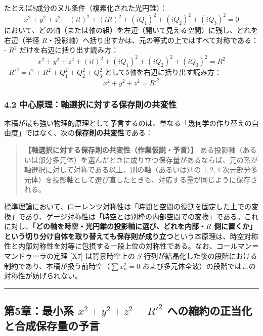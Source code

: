 \documentclass[
  a4paper,
]{ltjsarticle}
\begin{document}
たとえば8成分のヌル条件（複素化された光円錐）：
\[x^2 + y^2 + z^2 + (it)^2 + (iR)^2 + (iQ_1)^2 + (iQ_2)^2 + (iQ_3)^2 = 0\]
において、どの軸（または軸の組）を左辺（開いて見える空間）に残し、どれを右辺（半径
\(R\)・投影軸）へ括り出すかは、元の等式の上ではすべて対称である： -
\(R^2\) だけを右辺に括り出す読み方：
\[x^2 + y^2 + z^2 + (it)^2 + (iQ_1)^2 + (iQ_2)^2 + (iQ_3)^2 = R^2\] -
\(R'^2 = t^2 + R^2 + Q_1^2 + Q_2^2 + Q_3^2\)
として5軸を右辺に括り出す読み方： \[x^2 + y^2 + z^2 = R'^2\]

\subsubsection{4.2
中心原理：軸選択に対する保存則の共変性}\label{ux4e2dux5fc3ux539fux7406ux8ef8ux9078ux629eux306bux5bfeux3059ux308bux4fddux5b58ux5247ux306eux5171ux5909ux6027}

本稿が最も強い物理的原理として予言するのは、単なる「幾何学の作り替えの自由度」ではなく、次の\textbf{保存則の共変性}である：

\begin{quote}
\textbf{【軸選択に対する保存則の共変性（作業仮説・予言）】}
ある投影軸（あるいは部分多元体）を選んだときに成り立つ保存量があるならば、元の系が軸選択に対して対称である以上、別の軸（あるいは別の
\(1, 2, 4\)
次元部分多元体）を投影軸として選び直したときも、対応する量が同じように保存される。
\end{quote}

標準理論において、ローレンツ対称性は「時間と空間の役割を固定した上での変換」であり、ゲージ対称性は「時空とは別枠の内部空間での変換」である。これに対し、\textbf{「どの軸を時空・光円錐の投影軸に選び、どれを内部・\(R\)
側に置くか」という切り分け自体を取り替えても保存則が成り立つ}という本原理は、時空対称性と内部対称性を対等に包摂する一段上位の対称性である。なお、コールマン＝マンドゥーラの定理
{[}X7{]} は背景時空上の
\(S\)-行列が結晶化した後の段階における制約であり、本稿が扱う前時空（\(\sum x_n^2 = 0\)
および多元体全波）の段階ではこの対称性が妨げられない。

\begin{center}\rule{0.5\linewidth}{0.5pt}\end{center}

\subsection{\texorpdfstring{第5章：最小系 \(x^2 + y^2 + z^2 = R'^2\)
への縮約の正当化と合成保存量の予言}{第5章：最小系 x\^{}2 + y\^{}2 + z\^{}2 = R\textquotesingle\^{}2 への縮約の正当化と合成保存量の予言}}\label{ux7b2c5ux7ae0ux6700ux5c0fux7cfb-x2-y2-z2-r2-ux3078ux306eux7e2eux7d04ux306eux6b63ux5f53ux5316ux3068ux5408ux6210ux4fddux5b58ux91cfux306eux4e88ux8a00}
\end{document}
